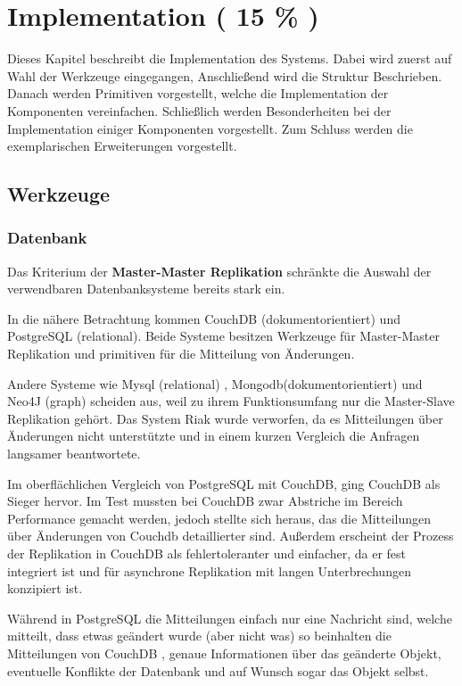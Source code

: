 \chapter{Implementation ( 15 \% ) }

Dieses Kapitel beschreibt die Implementation des Systems.
Dabei wird zuerst auf Wahl der Werkzeuge eingegangen,
Anschließend wird die Struktur Beschrieben.
Danach werden Primitiven vorgestellt, welche die Implementation der Komponenten vereinfachen.
Schließlich werden Besonderheiten bei der Implementation einiger Komponenten vorgestellt.
Zum Schluss werden die exemplarischen Erweiterungen vorgestellt.

\section{Werkzeuge}
\subsection{Datenbank}

Das Kriterium der \textbf{Master-Master Replikation}
schränkte die Auswahl der verwendbaren Datenbanksysteme bereits stark ein.

In die nähere Betrachtung kommen CouchDB (dokumentorientiert)
und PostgreSQL (relational).
Beide Systeme besitzen Werkzeuge für Master-Master Replikation
und primitiven für die Mitteilung von Änderungen.

Andere Systeme wie Mysql (relational) \cite{mysql:website}, Mongodb(dokumentorientiert) \cite{mongodb:website}
und  Neo4J (graph) \cite{neo4j:website} scheiden aus, weil zu ihrem Funktionsumfang
nur die Master-Slave Replikation geh\"ort.
Das System Riak \cite{riak:website} wurde verworfen, da es Mitteilungen über Änderungen nicht unterstützte und in einem kurzen Vergleich
die Anfragen langsamer beantwortete.

Im oberflächlichen Vergleich von PostgreSQL mit CouchDB, ging CouchDB als Sieger hervor.
Im Test mussten bei CouchDB zwar Abstriche im Bereich Performance gemacht werden,
jedoch stellte sich heraus, das die Mitteilungen über Änderungen von Couchdb detaillierter sind.
Außerdem erscheint der Prozess der Replikation in CouchDB als fehlertoleranter und einfacher, da er fest integriert ist und für asynchrone Replikation mit langen Unterbrechungen konzipiert ist.

Während in PostgreSQL die Mitteilungen einfach nur eine Nachricht sind,
welche mitteilt, dass etwas geändert wurde (aber nicht was)
so beinhalten die Mitteilungen von CouchDB \cite[Chap Notifications]{couchdb:guide}, genaue Informationen
über das geänderte Objekt, eventuelle Konflikte der Datenbank
und auf Wunsch sogar das Objekt selbst.

